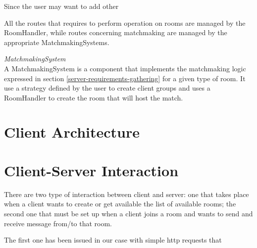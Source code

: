 Since the user may want to add other


All the routes that requires to perform operation on rooms are managed by the RoomHandler, while routes concerning matchmaking are managed by the appropriate MatchmakingSystems.


\bigskip
\textit{MatchmakingSystem}
\\
A MatchmakingSystem is a component that implements the matchmaking logic expressed in section \ref{server-requirements-gathering} for a given type of room. It use a strategy defined by the user to create client groups and uses a RoomHandler to create the room that will host the match.


\section{Client Architecture}

\section{Client-Server Interaction}
There are two type of interaction between client and server: one that takes place when a client wants to create or get available the list of available rooms; the second one that must be set up when a client joins a room and wants to send and receive message from/to that room.

The first one has been issued in our case with simple http requests that








